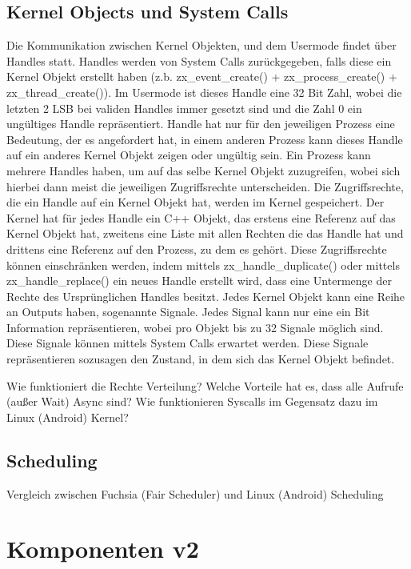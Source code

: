 \documentclass[a4paper]{scrartcl}
\begin{document}
\subsection{Kernel Objects und System Calls}
Die Kommunikation zwischen Kernel Objekten, und dem Usermode findet über Handles statt. Handles werden von System Calls zurückgegeben, falls diese ein Kernel Objekt erstellt haben (z.b. zx\_event\_create() + zx\_process\_create() + zx\_thread\_create()). Im Usermode ist dieses Handle eine 32 Bit Zahl, wobei die letzten 2 LSB bei validen Handles immer gesetzt sind und die Zahl 0 ein ungültiges Handle repräsentiert. Handle hat nur für den jeweiligen Prozess eine Bedeutung, der es angefordert hat, in einem anderen Prozess kann dieses Handle auf ein anderes Kernel Objekt zeigen oder ungültig sein. Ein Prozess kann mehrere Handles haben, um auf das selbe Kernel Objekt zuzugreifen, wobei sich hierbei dann meist die jeweiligen Zugriffsrechte unterscheiden. Die Zugriffsrechte, die ein Handle auf ein Kernel Objekt hat, werden im Kernel gespeichert. Der Kernel hat für jedes Handle ein C++ Objekt, das erstens eine Referenz auf das Kernel Objekt hat, zweitens eine Liste mit allen Rechten die das Handle hat und drittens eine Referenz auf den Prozess, zu dem es gehört. Diese Zugriffsrechte können einschränken werden, indem mittels zx\_handle\_duplicate() \cite{https://fuchsia.dev/fuchsia-src/reference/syscalls/handle_replace} oder mittels zx\_handle\_replace() \cite{https://fuchsia.dev/fuchsia-src/reference/syscalls/handle_replace} ein neues Handle erstellt wird, dass eine Untermenge der Rechte des Ursprünglichen Handles besitzt.
Jedes Kernel Objekt kann eine Reihe an Outputs haben, sogenannte Signale. Jedes Signal kann nur eine ein Bit Information repräsentieren, wobei pro Objekt bis zu 32 Signale möglich sind. Diese Signale können mittels System Calls erwartet werden. Diese Signale repräsentieren sozusagen den Zustand, in dem sich das Kernel Objekt befindet.



Wie funktioniert die Rechte Verteilung?
Welche Vorteile hat es, dass alle Aufrufe (außer Wait) Async sind?
Wie funktionieren Syscalls im Gegensatz dazu im Linux (Android) Kernel?
\subsection{Scheduling}
Vergleich zwischen Fuchsia (Fair Scheduler) und Linux (Android) Scheduling
\section{Komponenten v2}
\end{document}
